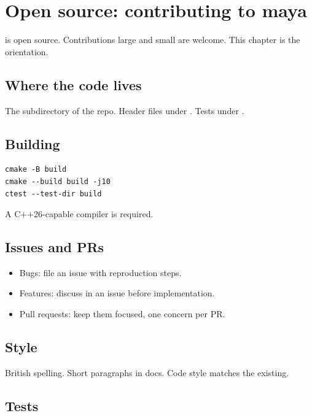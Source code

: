 \chapter{Open source: contributing to maya}
\label{ch:contributing}

\begin{aside}
\maya{} is open source. Contributions large and small are
welcome. This chapter is the orientation.
\end{aside}

\section{Where the code lives}

The  subdirectory of the repo. Header files
under . Tests under
.

\section{Building}

\begin{lstlisting}
cmake -B build
cmake --build build -j10
ctest --test-dir build
\end{lstlisting}

A C++26-capable compiler is required.

\section{Issues and PRs}

\begin{itemize}[leftmargin=*]
  \item Bugs: file an issue with reproduction steps.
  \item Features: discuss in an issue before
    implementation.
  \item Pull requests: keep them focused, one concern per
    PR.
\end{itemize}

\section{Style}

British spelling. Short paragraphs in docs. Code style
matches the existing.

\section{Tests}

